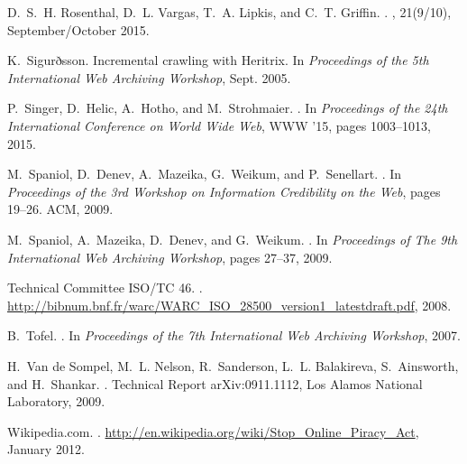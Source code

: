 \documentclass{sig-alternate}
\begin{document}
\begin{thebibliography}{10}
D.~S.~H. Rosenthal, D.~L. Vargas, T.~A. Lipkis, and C.~T. Griffin.
.
, 21(9/10), September/October 2015.

K.~Sigurðsson.
\newblock Incremental crawling with {Heritrix}.
\newblock In {\em Proceedings of the 5th International Web Archiving Workshop},
  Sept. 2005.

P.~Singer, D.~Helic, A.~Hotho, and M.~Strohmaier.
.
\newblock In {\em Proceedings of the 24th International Conference on World
  Wide Web}, WWW '15, pages 1003--1013, 2015.

M.~Spaniol, D.~Denev, A.~Mazeika, G.~Weikum, and P.~Senellart.
.
\newblock In {\em {Proceedings of the 3rd Workshop on Information Credibility
  on the Web}}, pages 19--26. ACM, 2009.

M.~Spaniol, A.~Mazeika, D.~Denev, and G.~Weikum.
.
\newblock In {\em {Proceedings of The 9th International Web Archiving
  Workshop}}, pages 27--37, 2009.

{Technical Committee ISO/TC 46}.
.
\newblock
  \url{http://bibnum.bnf.fr/warc/WARC_ISO_28500_version1_latestdraft.pdf},
  2008.

B.~Tofel.
.
\newblock In {\em Proceedings of the 7th International Web Archiving Workshop},
  2007.

H.~{Van de Sompel}, M.~L. Nelson, R.~Sanderson, L.~L. Balakireva, S.~Ainsworth,
  and H.~Shankar.
.
\newblock Technical Report arXiv:0911.1112, Los Alamos National Laboratory,
  2009.

{Wikipedia.com}.
.
\newblock \url{http://en.wikipedia.org/wiki/Stop_Online_Piracy_Act}, January
  2012.

\end{thebibliography}
\end{document}
